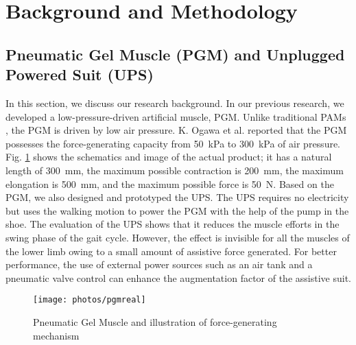\documentclass[paper,JRM,paper]{jaciiiarticle}
\begin{document}
\section{Background and Methodology}

\subsection{Pneumatic Gel Muscle (PGM) and Unplugged Powered Suit (UPS)}\label{pgmdelay}
In this section, we discuss our research background. In our previous research\cite{13}, we developed a low-pressure-driven artificial muscle, PGM. Unlike traditional PAMs \cite{14}, the PGM is driven by low air pressure. K. Ogawa et al. reported that the PGM possesses the force-generating capacity from \SI{50}{\kilo\pascal} to \SI{300}{\kilo\pascal} of air pressure. Fig. \ref{fig:pgmreal} shows the schematics and image of the actual product; it has a natural length of \SI{300}{\milli\meter}, the maximum possible contraction is \SI{200}{\milli\meter}, the maximum elongation is \SI{500}{\milli\meter}, and the maximum possible force is \SI{50}{\newton}. Based on the PGM, we also designed and prototyped the UPS. The UPS requires no electricity but uses the walking motion to power the PGM with the help of the pump in the shoe. The evaluation of the UPS shows that it reduces the muscle efforts in the swing phase of the gait cycle. However, the effect is invisible for all the muscles of the lower limb owing to a small amount of assistive force generated. For better performance, the use of external power sources such as an air tank and a pneumatic valve control can enhance the augmentation factor of the assistive suit. 

\begin{figure}
	\centering
	\texttt{[image: photos/pgmreal]}
	\caption{Pneumatic Gel Muscle and illustration of force-generating mechanism}
	\label{fig:pgmreal}
\end{figure}
\end{document}
